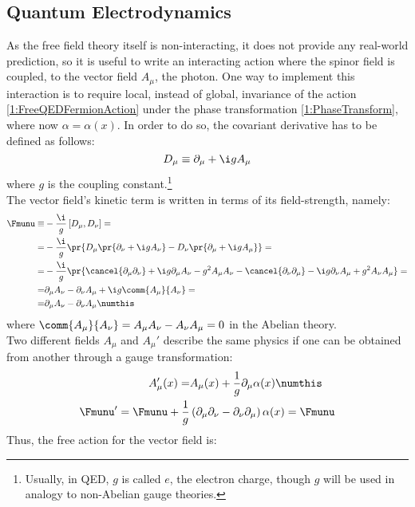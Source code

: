 \subsection{Quantum Electrodynamics\label{Sec1:QED}}
As the free field theory itself is non-interacting, it does not provide any real-world prediction, so it is useful to write an interacting action where the spinor field is coupled, to the vector field $A_\mu$, \ie the photon.
One way to implement this interaction is to require local, instead of global, invariance of the action \eqref{1:FreeQEDFermionAction} under the phase transformation \eqref{1:PhaseTransform}, where now $\alpha=\alpha(x)$.
In order to do so, the covariant derivative has to be defined as follows:
\begin{equation}
    D_\mu \equiv \partial_\mu+\i g A_\mu \label{1:QEDCovDeriv}
\end{equation}
where $g$ is the coupling constant.\footnote{Usually, in QED, $g$ is called $e$, the electron charge, though $g$ will be used in analogy to non-Abelian gauge theories.}\\
The vector field's kinetic term is written in terms of its field-strength, namely:
\begin{align*}
    \Fmunu\equiv& -\frac{\i}{g}\left[D_\mu,D_\nu\right] = \\
    =& -\frac{\i}{g}\pr{D_\mu\pr{\partial_\nu+\i g A_\nu} - D_\nu\pr{\partial_\mu+\i g A_\mu}}=\\
    =& -\frac{\i}{g}\pr{\cancel{\partial_\mu\partial_\nu} + \i g\partial_\mu A_\nu -g^2A_\mu A_\nu - \cancel{\partial_\nu\partial_\mu} - \i g\partial_\nu A_\mu + g^2A_\nu A_\mu}=\\
    =& \partial_\mu A_\nu - \partial_\nu A_\mu + \i g\comm{A_\mu}{A_\nu}=\\
    =& \partial_\mu A_\nu - \partial_\nu A_\mu \numthis\label{1:FieldStrU1}
\end{align*}
where $\comm{A_\mu}{A_\nu}=A_\mu A_\nu-A_\nu A_\mu=0$ in the Abelian theory.\\
Two different fields $A_\mu$ and $A_\mu'$ describe the same physics if one can be obtained from another through a gauge transformation:
\begin{align*}
    A_\mu'(x) =& A_\mu(x) + \frac1g \partial_\mu\alpha(x) \numthis\label{1:QEDGaugeTransf} \\
    \Fmunu' = \Fmunu + \frac1g&\left( \partial_\mu\partial_\nu-\partial_\nu\partial_\mu \right)\alpha(x) = \Fmunu
\end{align*}
Thus, the free action for the vector field is:
